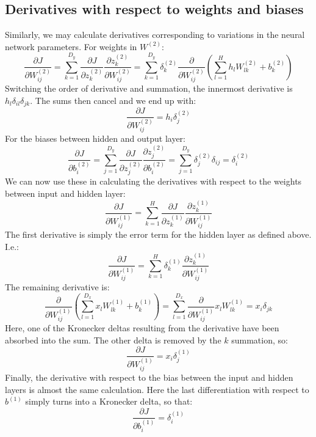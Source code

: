 \documentclass[12pt, a4paper]{article}
\numberwithin{equation}{section}
\begin{document}
\subsection{Derivatives with respect to weights and biases}
Similarly, we may calculate derivatives corresponding to variations in the neural network parameters. For weights in $W^{(2)}$:
\begin{equation}
\frac{\partial J}{\partial W^{(2)}_{ij}}=\sum_{k=1}^{D_y}\frac{\partial J}{\partial z^{(2)}_k}\frac{\partial z^{(2)}_k}{\partial W^{(2)}_{ij}}=\sum_{k=1}^{D_y}\delta^{(2)}_k\frac{\partial}{\partial W^{(2)}_{ij}}\left(\sum_{l=1}^H h_l W^{(2)}_{lk}+b^{(2)}_k\right)
\end{equation}
Switching the order of derivative and summation, the innermost derivative is $h_l\delta_{il}\delta_{jk}$. The sums then cancel and we end up with:
\begin{equation}
\frac{\partial J}{\partial W^{(2)}_{ij}}=h_i\delta^{(2)}_j
\end{equation}
For the biases between hidden and output layer:
\begin{equation}
\frac{\partial J}{\partial b^{(2)}_i}=\sum_{j=1}^{D_y}\frac{\partial J}{\partial z^{(2)}_j}\frac{\partial z^{(2)}_j}{\partial b^{(2)}_i}=\sum_{j=1}^{D_y}\delta^{(2)}_j\delta_{ij}=\delta^{(2)}_i
\end{equation}
We can now use these in calculating the derivatives with respect to the weights between input and hidden layer:
\begin{equation}
\frac{\partial J}{\partial W^{(1)}_{ij}}=\sum_{k=1}^H\frac{\partial J}{\partial z^{(1)}_k}\frac{\partial z^{(1)}_k}{\partial W^{(1)}_{ij}}
\end{equation}
The first derivative is simply the error term for the hidden layer as defined above. I.e.:
\begin{equation}
\frac{\partial J}{\partial W^{(1)}_{ij}}=\sum_{k=1}^H\delta^{(1)}_k\frac{\partial z^{(1)}_k}{\partial W^{(1)}_{ij}}
\end{equation}
The remaining derivative is:
\begin{equation}
\frac{\partial}{\partial W^{(1)}_{ij}}\left(\sum_{l=1}^{D_x}x_l W^{(1)}_{lk}+b^{(1)}_k\right)=\sum_{l=1}^{D_x}\frac{\partial}{\partial W^{(1)}_{ij}}x_l W^{(1)}_{lk}=x_i\delta_{jk}
\end{equation}
Here, one of the Kronecker deltas resulting from the derivative have been absorbed into the sum. The other delta is removed by the $k$ summation, so:
\begin{equation}
\frac{\partial J}{\partial W^{(1)}_{ij}}=x_i\delta^{(1)}_j
\end{equation}
Finally, the derivative with respect to the bias between the input and hidden layers is almost the same calculation. Here the last differentiation with respect to $b^{(1)}$ simply turns into a Kronecker delta, so that:
\begin{equation}
\frac{\partial J}{\partial b^{(1)}_i}=\delta^{(1)}_i
\end{equation}
\end{document}
